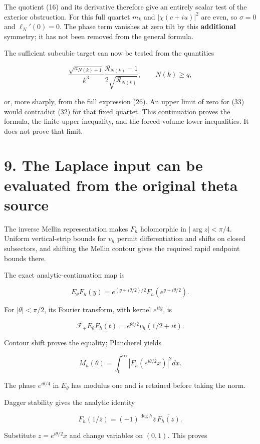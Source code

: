 \documentclass[
  11pt,
]{article}
\begin{document}
The quotient (16) and its derivative therefore give an entirely scalar
test of the exterior obstruction. For this full quartet \(m_k\) and
\(|\chi(c+iu)|^2\) are even, so \(\sigma=0\) and \(\ell_N'(0)=0\). The
phase term vanishes at zero tilt by this \textbf{additional} symmetry;
it has not been removed from the general formula.

The sufficient subcubic target can now be tested from the quantities

\[
\frac{\sqrt{a_{N(k)+1}}}{k^3}
\frac{\mathcal R_{N(k)}-1}{2\sqrt{\mathcal R_{N(k)}}},
\qquad N(k)\ge q,
\tag{33}
\]

or, more sharply, from the full expression (26). An upper limit of zero
for (33) would contradict (32) for that fixed quartet. This continuation
proves the formula, the finite upper inequality, and the forced volume
lower inequalities. It does not prove that limit.

\section{9. The Laplace input can be evaluated from the original theta
source}\label{the-laplace-input-can-be-evaluated-from-the-original-theta-source}

The inverse Mellin representation makes \(F_h\) holomorphic in
\(|\arg z|<\pi/4\). Uniform vertical-strip bounds for \(v_h\) permit
differentiation and shifts on closed subsectors, and shifting the Mellin
contour gives the required rapid endpoint bounds there.

The exact analytic-continuation map is

\[
E_\theta F_h(y)
=e^{(y+i\theta/2)/2}F_h(e^{y+i\theta/2}).
\]

For \(|\theta|<\pi/2\), its Fourier transform, with kernel \(e^{ity}\),
is

\[
\mathcal F_+E_\theta F_h(t)=e^{\theta t/2}v_h(1/2+it).
\]

Contour shift proves the equality; Plancherel yields

\[
\boxed{M_h(\theta)=\int_0^\infty|F_h(e^{i\theta/2}x)|^2dx.}
\tag{34}
\]

The phase \(e^{i\theta/4}\) in \(E_\theta\) has modulus one and is
retained before taking the norm.

Dagger stability gives the analytic identity

\[
F_h(1/\bar z)=(-1)^{\deg h}\bar z\,\overline{F_h(z)}.
\]

Substitute \(z=e^{i\theta/2}x\) and change variables on \((0,1)\). This
proves
\end{document}

